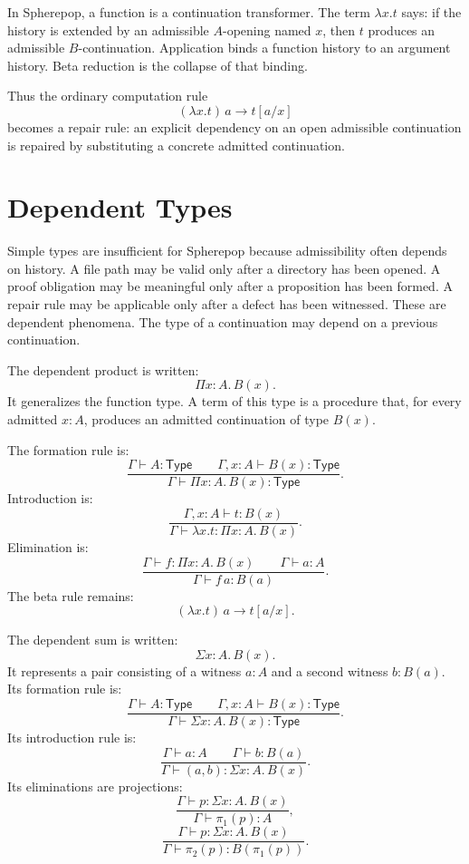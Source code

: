 \documentclass[12pt,oneside]{article}
\newcommand{\Type}{\mathsf{Type}}
\newcommand{\step}{\longrightarrow}
\newcommand{\judges}{\vdash}
\begin{document}
In Spherepop, a function is a continuation transformer. The term $\lambda x.t$ says: if the history is extended by an admissible $A$-opening named $x$, then $t$ produces an admissible $B$-continuation. Application binds a function history to an argument history. Beta reduction is the collapse of that binding.

Thus the ordinary computation rule
\[
(\lambda x.t)\,a \step t[a/x]
\]
becomes a repair rule: an explicit dependency on an open admissible continuation is repaired by substituting a concrete admitted continuation.

\section{Dependent Types}

Simple types are insufficient for Spherepop because admissibility often depends on history. A file path may be valid only after a directory has been opened. A proof obligation may be meaningful only after a proposition has been formed. A repair rule may be applicable only after a defect has been witnessed. These are dependent phenomena. The type of a continuation may depend on a previous continuation.

The dependent product is written:
\[
\Pi x:A.\,B(x).
\]
It generalizes the function type. A term of this type is a procedure that, for every admitted $x:A$, produces an admitted continuation of type $B(x)$.

The formation rule is:
\[
\frac{\Gamma \judges A : \Type \qquad \Gamma,x:A \judges B(x) : \Type}
{\Gamma \judges \Pi x:A.\,B(x) : \Type}.
\]
Introduction is:
\[
\frac{\Gamma,x:A \judges t : B(x)}
{\Gamma \judges \lambda x.t : \Pi x:A.\,B(x)}.
\]
Elimination is:
\[
\frac{\Gamma \judges f : \Pi x:A.\,B(x) \qquad \Gamma \judges a : A}
{\Gamma \judges f\,a : B(a)}.
\]
The beta rule remains:
\[
(\lambda x.t)\,a \step t[a/x].
\]

The dependent sum is written:
\[
\Sigma x:A.\,B(x).
\]
It represents a pair consisting of a witness $a:A$ and a second witness $b:B(a)$. Its formation rule is:
\[
\frac{\Gamma \judges A : \Type \qquad \Gamma,x:A \judges B(x) : \Type}
{\Gamma \judges \Sigma x:A.\,B(x) : \Type}.
\]
Its introduction rule is:
\[
\frac{\Gamma \judges a:A \qquad \Gamma \judges b:B(a)}
{\Gamma \judges (a,b):\Sigma x:A.\,B(x)}.
\]
Its eliminations are projections:
\[
\frac{\Gamma \judges p:\Sigma x:A.\,B(x)}
{\Gamma \judges \pi_1(p):A},
\]
\[
\frac{\Gamma \judges p:\Sigma x:A.\,B(x)}
{\Gamma \judges \pi_2(p):B(\pi_1(p))}.
\]
\end{document}
